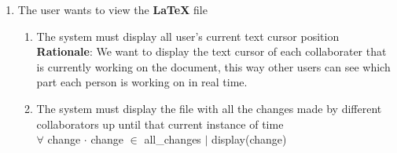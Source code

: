 \documentclass[12pt, titlepage]{article}
\begin{document}
\begin{enumerate}[{BE}1.]
\begin{enumerate}[resume*]
		\end{enumerate}
		\item The user wants to view the \textbf{LaTeX} file
		\begin{enumerate}[resume*]
			\item The system must display all user's current text cursor position \\
			\textbf{Rationale}: We want to display the text cursor of each collaborater that is currently working on the document, this way other users can see which part each person is working on in real time.
			\item The system must display the file with all the changes made by different collaborators up until that current instance of time\\
			
			$\forall$ change $\cdot$ change $\in$ all\_changes $\vert$ display(change)\\
			

\end{enumerate}
\end{enumerate}
\end{document}
